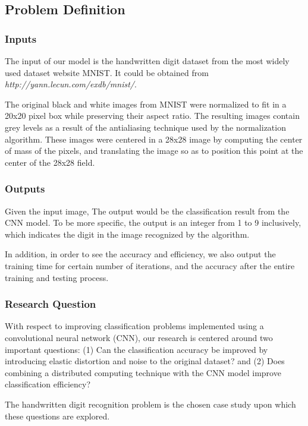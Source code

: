 \subsection{Problem Definition}
\label{subsec:problem}
\subsubsection{Inputs}
The input of our model is the handwritten digit dataset from the most widely used dataset website MNIST. It could be obtained
from \emph{http://yann.lecun.com/exdb/mnist/}.

The original black and white images from MNIST were normalized to fit in a 20x20 pixel box while preserving their aspect ratio. The resulting images contain grey levels as a result of the antialiasing technique used by the normalization algorithm. These images were centered in a 28x28 image by computing the center of mass of the pixels, and translating the image so as to position this point at the center of the 28x28 field.

\subsubsection{Outputs}
Given the input image, The output would be the classification result from the CNN model. To be more specific, the output is an integer from 1 to 9 inclusively, which indicates the digit in the image recognized by the algorithm.

In addition, in order to see the accuracy and efficiency, we also output the training time for certain number of iterations, and the accuracy after the entire training and testing process.
\subsubsection{Research Question}
With respect to improving classification problems implemented using a convolutional neural network (CNN), our research is centered around two important questions: (1) Can the classification accuracy be improved by introducing elastic distortion and noise to the original dataset? and (2) Does combining a distributed computing technique with the CNN model improve classification efficiency?

The handwritten digit recognition problem is the chosen case study upon which these questions are explored. 

